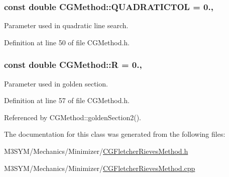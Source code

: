 \hypertarget{classCGMethod_acd9c51fe93f6d563f731dd2e30eb7922}{
\subsubsection[{Q\+U\+A\+D\+R\+A\+T\+I\+C\+T\+O\+L}]{\setlength{\rightskip}{0pt plus 5cm}const double C\+G\+Method\+::\+Q\+U\+A\+D\+R\+A\+T\+I\+C\+T\+O\+L = 0.\hspace{0.3cm}{\ttfamily [protected]}, {\ttfamily [inherited]}}}\label{classCGMethod_acd9c51fe93f6d563f731dd2e30eb7922}


Parameter used in quadratic line search. 



Definition at line 50 of file C\+G\+Method.\+h.

\hypertarget{classCGMethod_a2e7906b4b29a1b76dca43d56eaf2efac}{
\subsubsection[{R}]{\setlength{\rightskip}{0pt plus 5cm}const double C\+G\+Method\+::\+R = 0.\hspace{0.3cm}{\ttfamily [protected]}, {\ttfamily [inherited]}}}\label{classCGMethod_a2e7906b4b29a1b76dca43d56eaf2efac}


Parameter used in golden section. 



Definition at line 57 of file C\+G\+Method.\+h.



Referenced by C\+G\+Method\+::golden\+Section2().



The documentation for this class was generated from the following files\+:\begin{DoxyCompactItemize}
\item 
M3\+S\+Y\+M/\+Mechanics/\+Minimizer/\hyperlink{CGFletcherRievesMethod_8h}{C\+G\+Fletcher\+Rieves\+Method.\+h}\item 
M3\+S\+Y\+M/\+Mechanics/\+Minimizer/\hyperlink{CGFletcherRievesMethod_8cpp}{C\+G\+Fletcher\+Rieves\+Method.\+cpp}\end{DoxyCompactItemize}
